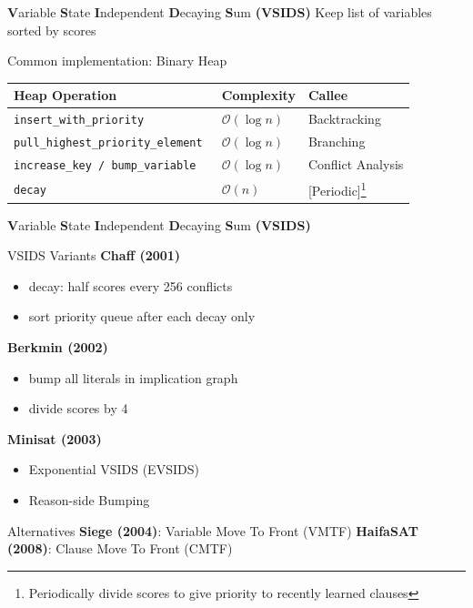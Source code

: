 \documentclass[t]{sdqbeamer}
\begin{document}
\begin{frame}{{\bf V}ariable {\bf S}tate {\bf I}ndependent {\bf D}ecaying {\bf S}um {\bf (VSIDS)}}
Keep list of variables sorted by scores
\begin{block}{Common implementation: Binary Heap}
    \setcolsep{1em}
    \begin{tabularx}{\linewidth}{llX}
    \bf Heap Operation & \bf Complexity & \bf Callee\\
    \hline
    \tt insert\_with\_priority & $\mathcal{O}(\log n)$ & Backtracking\\
    \tt pull\_highest\_priority\_element & $\mathcal{O}(\log n)$ & Branching\\
    \tt increase\_key / bump\_variable & $\mathcal{O}(\log n)$ & Conflict Analysis\\
    \tt decay & $\mathcal{O}(n)$ & [Periodic]\footnote{Periodically divide scores to give priority to recently learned clauses}
    \end{tabularx}
\end{block}
\end{frame}
    
\begin{frame}{{\bf V}ariable {\bf S}tate {\bf I}ndependent {\bf D}ecaying {\bf S}um {\bf (VSIDS)}}
\vspace*{-1ex}
\begin{exampleblock}{VSIDS Variants}
\textbf{Chaff (2001)}
\begin{itemize}
    \item decay: half scores every 256 conflicts
    \item sort priority queue after each decay only
\end{itemize}
\textbf{Berkmin (2002)}
\begin{itemize}
    \item bump all literals in implication graph
    \item divide scores by 4
\end{itemize}
\textbf{Minisat (2003)}
\begin{itemize}
    \item Exponential VSIDS (EVSIDS)
    \item Reason-side Bumping
\end{itemize}
\end{exampleblock}
%
\begin{block}{Alternatives}
\textbf{Siege (2004)}: Variable Move To Front (VMTF) \qquad \textbf{HaifaSAT (2008)}: Clause Move To Front (CMTF)
\end{block}
\end{frame}
    
\end{document}

